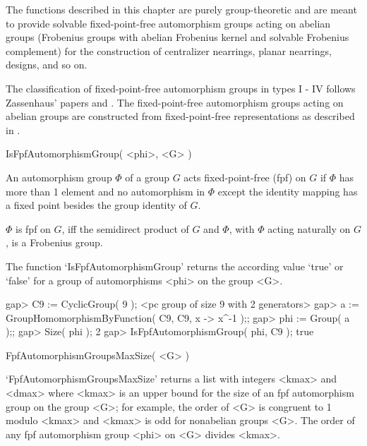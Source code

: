 %
%

The functions described in this chapter are purely group-theoretic and
are meant to provide solvable fixed-point-free automorphism groups acting on
abelian groups (Frobenius groups with abelian Frobenius kernel and solvable
Frobenius complement)
for the construction of centralizer nearrings, planar nearrings, designs,
and so on.

The classification of fixed-point-free automorphism groups in types I - IV 
follows Zassenhaus' papers and \cite{Wolf:Spaces}.
The fixed-point-free automorphism groups acting on abelian groups are
constructed from fixed-point-free representations as described in 
\cite{Mayr:Representations}.




\>IsFpfAutomorphismGroup( <phi>, <G> )

An automorphism group $\Phi$ of a group $G$ acts fixed-point-free (fpf) on $G$
if $\Phi$ has more than 1 element and no automorphism in $\Phi$ except the
identity mapping has a fixed point besides the group identity of $G$.

$\Phi$ is fpf on $G$, iff the semidirect product of
$G$ and $\Phi$, with $\Phi$ acting naturally on $G$, is a Frobenius group.

The function `IsFpfAutomorphismGroup' returns the according value 
`true' or `false' for a group of automorphisms <phi> on the group <G>.

\beginexample
    gap> C9 := CyclicGroup( 9 );
    <pc group of size 9 with 2 generators>
    gap> a := GroupHomomorphismByFunction( C9, C9, x -> x^-1 );;
    gap> phi := Group( a );;
    gap> Size( phi );
    2
    gap> IsFpfAutomorphismGroup( phi, C9 );
    true
\endexample

\>FpfAutomorphismGroupsMaxSize( <G> )

`FpfAutomorphismGroupsMaxSize' returns a list with integers <kmax>
and <dmax> where <kmax> is an upper bound for the size of an fpf
automorphism group on the group <G>; for example, the order of <G> is
congruent to 1 modulo <kmax> and <kmax> is odd for nonabelian groups <G>. 
The order of any fpf automorphism group <phi> on <G> divides <kmax>.

